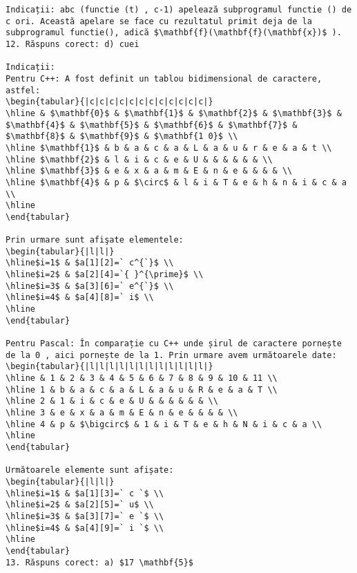 \begin{verbatim}
Indicații: abc (functie (t) , c-1) apelează subprogramul functie () de c ori. Această apelare se face cu rezultatul primit deja de la subprogramul functie(), adică $\mathbf{f}(\mathbf{f}(\mathbf{x})$ ).
12. Răspuns corect: d) cuei

Indicații:
Pentru C++: A fost definit un tablou bidimensional de caractere, astfel:
\begin{tabular}{|c|c|c|c|c|c|c|c|c|c|c|c|}
\hline & $\mathbf{0}$ & $\mathbf{1}$ & $\mathbf{2}$ & $\mathbf{3}$ & $\mathbf{4}$ & $\mathbf{5}$ & $\mathbf{6}$ & $\mathbf{7}$ & $\mathbf{8}$ & $\mathbf{9}$ & $\mathbf{1 0}$ \\
\hline $\mathbf{1}$ & b & a & c & a & L & a & u & r & e & a & t \\
\hline $\mathbf{2}$ & l & i & c & e & U & & & & & & \\
\hline $\mathbf{3}$ & e & x & a & m & E & n & e & & & & \\
\hline $\mathbf{4}$ & p & $\circ$ & l & i & T & e & h & n & i & c & a \\
\hline
\end{tabular}

Prin urmare sunt afişate elementele:
\begin{tabular}{|l|l|}
\hline$i=1$ & $a[1][2]=` c^{`}$ \\
\hline$i=2$ & $a[2][4]=`{ }^{\prime}$ \\
\hline$i=3$ & $a[3][6]=` e^{`}$ \\
\hline$i=4$ & $a[4][8]=` i$ \\
\hline
\end{tabular}

Pentru Pascal: În comparație cu C++ unde șirul de caractere pornește de la 0 , aici pornește de la 1. Prin urmare avem următoarele date:
\begin{tabular}{|l|l|l|l|l|l|l|l|l|l|l|l|}
\hline & 1 & 2 & 3 & 4 & 5 & 6 & 7 & 8 & 9 & 10 & 11 \\
\hline 1 & b & a & c & a & L & a & u & R & e & a & T \\
\hline 2 & 1 & i & c & e & U & & & & & & \\
\hline 3 & e & x & a & m & E & n & e & & & & \\
\hline 4 & p & $\bigcirc$ & 1 & i & T & e & h & N & i & c & a \\
\hline
\end{tabular}

Următoarele elemente sunt afișate:
\begin{tabular}{|l|l|}
\hline$i=1$ & $a[1][3]=` c `$ \\
\hline$i=2$ & $a[2][5]=` u$ \\
\hline$i=3$ & $a[3][7]=` e `$ \\
\hline$i=4$ & $a[4][9]=` i `$ \\
\hline
\end{tabular}
13. Răspuns corect: a) $17 \mathbf{5}$


\end{verbatim}
